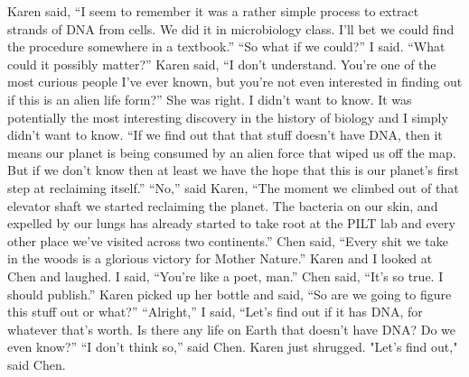 \documentclass[a4paper]{article}
\begin{document}
Karen said, “I seem to remember it was a rather simple process to extract strands of DNA from cells. We did it in microbiology class. I’ll bet we could find the procedure somewhere in a textbook.”
“So what if we could?” I said. “What could it possibly matter?”
Karen said, “I don’t understand. You’re one of the most curious people I’ve ever known, but you’re not even interested in finding out if this is an alien life form?”
She was right. I didn’t want to know. It was potentially the most interesting discovery in the history of biology and I simply didn’t want to know.
“If we find out that that stuff doesn’t have DNA, then it means our planet is being consumed by an alien force that wiped us off the map. But if we don’t know then at least we have the hope that this is our planet’s first step at reclaiming itself.”
“No,” said Karen, “The moment we climbed out of that elevator shaft we started reclaiming the planet. The bacteria on our skin, and expelled by our lungs has already started to take root at the PILT lab and every other place we’ve visited across two continents.”
Chen said, “Every shit we take in the woods is a glorious victory for Mother Nature.”
Karen and I looked at Chen and laughed. I said, “You’re like a poet, man.”
Chen said, “It’s so true. I should publish.”
Karen picked up her bottle and said, “So are we going to figure this stuff out or what?”
“Alright,” I said, “Let’s find out if it has DNA, for whatever that’s worth. Is there any life on Earth that doesn’t have DNA? Do we even know?”
“I don’t think so,” said Chen. Karen just shrugged.
"Let's find out," said Chen.
\end{document}
